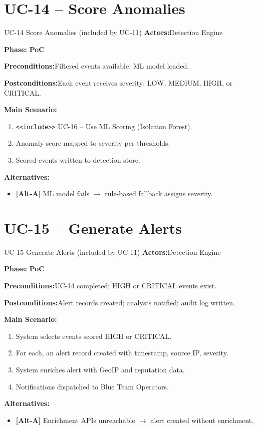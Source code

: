\documentclass[12pt,a4paper]{report}
\newcommand{\ucfield}[2]{%
    \noindent\textbf{\color{helixpurplemid}#1:}\quad #2\par\medskip
}
\newcommand{\ucphase}[1]{%
    \noindent\textbf{\color{helixpurplemid}Phase:}\quad%
    \ifstrequal{#1}{PoC}{\textcolor{helixteal}{\textbf{PoC}}}{\textcolor{helixamber}{\textbf{Future MVP}}}%
    \par\medskip
}
\begin{document}
\section{UC-14 -- Score Anomalies}
\begin{ucbox}{UC-14 \quad Score Anomalies \textnormal{(included by UC-11)}}
    \ucfield{Actors}{Detection Engine}
    \ucphase{PoC}
    \ucfield{Preconditions}{Filtered events available. ML model loaded.}
    \ucfield{Postconditions}{Each event receives severity: LOW, MEDIUM, HIGH, or CRITICAL.}
    \textbf{\color{helixpurplemid}Main Scenario:}
    \begin{enumerate}
        \item \texttt{<<include>>} UC-16 -- Use ML Scoring (Isolation Forest).
        \item Anomaly score mapped to severity per thresholds.
        \item Scored events written to detection store.
    \end{enumerate}
    \textbf{\color{helixpurplemid}Alternatives:}
    \begin{itemize}
        \item \textbf{[Alt-A]} ML model fails $\rightarrow$ rule-based fallback assigns severity.
    \end{itemize}
\end{ucbox}

\section{UC-15 -- Generate Alerts}
\begin{ucbox}{UC-15 \quad Generate Alerts \textnormal{(included by UC-11)}}
    \ucfield{Actors}{Detection Engine}
    \ucphase{PoC}
    \ucfield{Preconditions}{UC-14 completed; HIGH or CRITICAL events exist.}
    \ucfield{Postconditions}{Alert records created; analysts notified; audit log written.}
    \textbf{\color{helixpurplemid}Main Scenario:}
    \begin{enumerate}
        \item System selects events scored HIGH or CRITICAL.
        \item For each, an alert record created with timestamp, source IP, severity.
        \item System enriches alert with GeoIP and reputation data.
        \item Notifications dispatched to Blue Team Operators.
    \end{enumerate}
    \textbf{\color{helixpurplemid}Alternatives:}
    \begin{itemize}
        \item \textbf{[Alt-A]} Enrichment APIs unreachable $\rightarrow$ alert created without enrichment.
    \end{itemize}
\end{ucbox}
\end{document}
